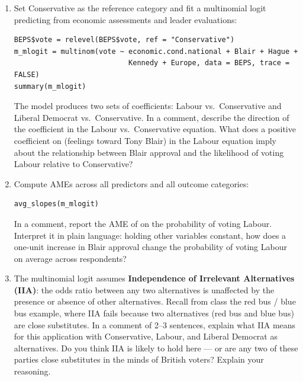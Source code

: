 \begin{enumerate}[label=\alph*)]

  \item Set Conservative as the reference category and fit a multinomial logit predicting  from economic assessments and leader evaluations:
  \begin{lstlisting}
BEPS$vote = relevel(BEPS$vote, ref = "Conservative")
m_mlogit = multinom(vote ~ economic.cond.national + Blair + Hague +
                           Kennedy + Europe, data = BEPS, trace = FALSE)
summary(m_mlogit)
  \end{lstlisting}
  The model produces two sets of coefficients: Labour vs.\ Conservative and Liberal Democrat vs.\ Conservative. In a comment, describe the direction of the  coefficient in the Labour vs.\ Conservative equation. What does a positive coefficient on  (feelings toward Tony Blair) in the Labour equation imply about the relationship between Blair approval and the likelihood of voting Labour relative to Conservative?

  \item Compute AMEs across all predictors and all outcome categories:
  \begin{lstlisting}
avg_slopes(m_mlogit)
  \end{lstlisting}
  In a comment, report the AME of  on the probability of voting Labour. Interpret it in plain language: holding other variables constant, how does a one-unit increase in Blair approval change the probability of voting Labour on average across respondents?

  \item The multinomial logit assumes \textbf{Independence of Irrelevant Alternatives (IIA)}: the odds ratio between any two alternatives is unaffected by the presence or absence of other alternatives. Recall from class the red bus / blue bus example, where IIA fails because two alternatives (red bus and blue bus) are close substitutes. In a comment of 2--3 sentences, explain what IIA means for this application with Conservative, Labour, and Liberal Democrat as alternatives. Do you think IIA is likely to hold here --- or are any two of these parties close substitutes in the minds of British voters? Explain your reasoning.

\end{enumerate}

\newpage

